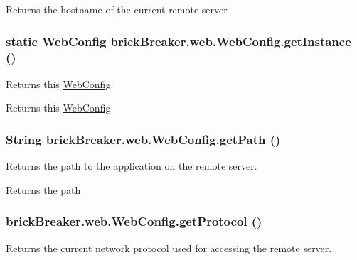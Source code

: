 \begin{DoxyReturn}{Returns}
the hostname of the current remote server 
\end{DoxyReturn}
\hypertarget{classbrick_breaker_1_1web_1_1_web_config_aea2e81e51a4834d9d0bbc1705d7c4bfc}{
\subsubsection[{getInstance}]{\setlength{\rightskip}{0pt plus 5cm}static {\bf WebConfig} brickBreaker.web.WebConfig.getInstance ()}}
\label{classbrick_breaker_1_1web_1_1_web_config_aea2e81e51a4834d9d0bbc1705d7c4bfc}
Returns this {\ttfamily \hyperlink{classbrick_breaker_1_1web_1_1_web_config}{WebConfig}}.

\begin{DoxyReturn}{Returns}
this {\ttfamily \hyperlink{classbrick_breaker_1_1web_1_1_web_config}{WebConfig}} 
\end{DoxyReturn}
\hypertarget{classbrick_breaker_1_1web_1_1_web_config_a2c7cb30ccc2b83bceada6faccc4f37fc}{
\subsubsection[{getPath}]{\setlength{\rightskip}{0pt plus 5cm}String brickBreaker.web.WebConfig.getPath ()}}
\label{classbrick_breaker_1_1web_1_1_web_config_a2c7cb30ccc2b83bceada6faccc4f37fc}
Returns the path to the application on the remote server.

\begin{DoxyReturn}{Returns}
the path 
\end{DoxyReturn}
\hypertarget{classbrick_breaker_1_1web_1_1_web_config_a3718624e9a8e0cb7d4321cbadc716fae}{
\subsubsection[{getProtocol}]{ brickBreaker.web.WebConfig.getProtocol ()}}
\label{classbrick_breaker_1_1web_1_1_web_config_a3718624e9a8e0cb7d4321cbadc716fae}
Returns the current network protocol used for accessing the remote server.

